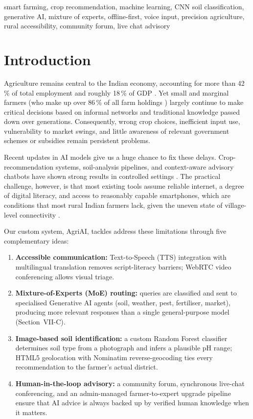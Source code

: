\documentclass[conference]{IEEEtran}
\begin{document}
\begin{IEEEkeywords}
smart farming, crop recommendation, machine learning, CNN soil classification,
generative AI, mixture of experts, offline-first, voice input, precision
agriculture, rural accessibility, community forum, live chat advisory
\end{IEEEkeywords}

\section{Introduction}

Agriculture remains central to the Indian economy, accounting for more than
42\,\% of total employment and roughly 18\,\% of GDP \cite{mospi2023}. Yet
small and marginal farmers (who make up over 86\,\% of all farm holdings
\cite{agcensus2015}) largely continue to make critical decisions based on
informal networks and traditional knowledge passed down over generations.
Consequently, wrong crop choices, inefficient input use,
vulnerability to market swings, and little awareness of relevant government
schemes or subsidies remain persistent problems.

Recent updates in AI models give us a huge chance to fix these delays. Crop-recommendation systems, soil-analysis
pipelines, and context-aware advisory chatbots have shown strong results
in controlled settings \cite{liakos2018}. The practical challenge, however,
is that most existing tools assume reliable internet, a degree of digital
literacy, and access to reasonably capable smartphones, which are conditions that
most rural Indian farmers lack, given the uneven state of
village-level connectivity \cite{trai2023}.

Our custom system, AgriAI, tackles
address these limitations through five complementary ideas:
\begin{enumerate}
  \item \textbf{Accessible communication:} Text-to-Speech (TTS) integration with multilingual translation removes script-literacy barriers; WebRTC video conferencing allows visual triage.
    
    
  \item \textbf{Mixture-of-Experts (MoE) routing:} queries are classified
    and sent to specialised Generative AI agents (soil, weather, pest,
    fertiliser, market), producing more relevant responses than a single
    general-purpose model (Section~VII-C).
  \item \textbf{Image-based soil identification:} a custom Random Forest classifier
    determines soil type from a photograph and infers a plausible pH range;
    HTML5 geolocation with Nominatim reverse-geocoding ties every
    recommendation to the farmer's actual district.
  \item \textbf{Human-in-the-loop advisory:} a community forum, synchronous
    live-chat conferencing, and an admin-managed farmer-to-expert upgrade
    pipeline ensure that AI advice is always backed up by verified human
    knowledge when it matters.
\end{enumerate}
\end{document}
